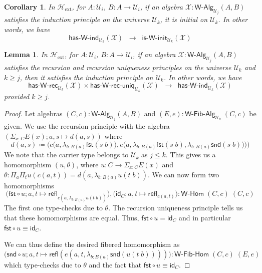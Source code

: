 \documentclass[11pt]{article}
\newcommand{\X}{\mathcal{X}}
\newcommand{\fst}{\mathsf{fst}}
\newcommand{\snd}{\mathsf{snd}}
\newcommand{\comp}{\circ}
\newcommand{\idfun}[1]{\mathsf{id}_{#1}}
\newcommand{\prd}[1]{\Pi_{#1}}
\newcommand{\sm}[1]{\Sigma_{#1}}
\newcommand{\lam}[1]{\lambda_{#1}}
\newcommand{\defeq}{\coloneqq}
\newcommand{\refl}{\mathsf{refl}}
\newcommand{\W}{\mathsf{W}}
\newcommand{\UU}{\mathcal{U}}
\newcommand{\WAlg}{\mathsf{W}\text{-}\mathsf{Alg}}
\newcommand{\WFibAlg}{\mathsf{W}\text{-}\mathsf{Fib}\text{-}\mathsf{Alg}}
\newcommand{\WHom}{\mathsf{W}\text{-}\mathsf{Hom}}
\newcommand{\WFibHom}{\mathsf{W}\text{-}\mathsf{Fib}\text{-}\mathsf{Hom}}
\newcommand{\HasWRec}{\mathsf{has}\text{-}\mathsf{W}\text{-}\mathsf{rec}}
\newcommand{\HasWInd}{\mathsf{has}\text{-}\mathsf{W}\text{-}\mathsf{ind}}
\newcommand{\HasWRecUniq}{\mathsf{has}\text{-}\mathsf{W}\text{-}\mathsf{rec}\text{-}\mathsf{uniq}}
\newcommand{\IsWInit}{\mathsf{is}\text{-}\mathsf{\W}\text{-}\mathsf{init}}
\newcommand{\Hext}{\mathcal{H}_{\mathrm{ext}}}
\newtheorem{lemma}[theorem]{Lemma}
\newtheorem{corollary}[theorem]{Corollary}
\theoremstyle{definition}
\begin{document}

\begin{corollary}\label{lem:WIndImpInit}
In $\Hext$, for $A:\UU_i$, $B : A \to \UU_i$, if an algebra $\X : \WAlg_{\UU_j}(A,B)$ satisfies the induction principle on the universe $\UU_k$, it is initial on $\UU_k$. In other words, we have
\[ \HasWInd_{\UU_k}(\X) \;\; \rightarrow \;\; \IsWInit_{\UU_k}(\X) \]
\end{corollary}

\begin{lemma}\label{lem:WRecUniqImpInd}
In $\Hext$, for $A:\UU_i$, $B : A \to \UU_i$, if an algebra $\X : \WAlg_{\UU_j}(A,B)$ satisfies the recursion and recursion uniqueness principles on the universe $\UU_k$ and $k \geq j$, then it satisfies the induction principle on $\UU_k$. In other words, we have
\[ \HasWRec_{\UU_k}(\X) \times \HasWRecUniq_{\UU_k}(\X) \;\; \rightarrow \; \; \HasWInd_{\UU_k}(\X) \]
provided $k \geq j$.
\end{lemma}
\begin{proof}
Let algebras $(C,c) : \WAlg_{\UU_j}(A,B)$ and $(E,e) : \WFibAlg_{\UU_k} \; (C,c)$ be given. 
We use the recursion principle with the algebra $(\sm{x:C} E(x); a,s \mapsto d(a,s))$ where
\[ d(a,s) \defeq \Big(c\big(a,\lam{b:B(a)} \fst(s\;b)\big), e\big(a, \lam{b:B(a)} \fst(s\;b), \lam{b:B(a)} \snd(s\;b)\big) \Big) \big) \]
We note that the carrier type belongs to $\UU_k$ as $j \leq k$. This gives us a homomorphism $(u,\theta)$, where $u : C \to \sm{x:C} E(x)$ and $\theta : \prd{a}\prd{t} u(c(a,t)) = d(a,\lam{b:B(a)}u(t\;b))$. We can now form two homomorphisms 
\[\big(\fst \comp u; a,t \mapsto \refl_{c(a,\lam{b:B(a)}u(t\;b))}\big), \big(\idfun{C}; a,t \mapsto \refl_{c(a,t)}\big) : \WHom \; (C,c) \; (C,c)\] The first one type-checks due to $\theta$. The recursion uniqueness principle tells us that these homomorphisms are equal. Thus, $\fst \comp u = \idfun{C}$ and in particular $\fst \comp u \equiv \idfun{C}$. 

We can thus define the desired fibered homomorphism as \[\big(\snd \comp u; a,t \mapsto \refl(e(a,t,\lam{b:B(a)}\snd(u(t\;b))))\big) : \WFibHom \; (C,c) \; (E,e)\]
which type-checks due to $\theta$ and the fact that $\fst \comp u \equiv \idfun{C}$.
\end{proof}
\end{document}
